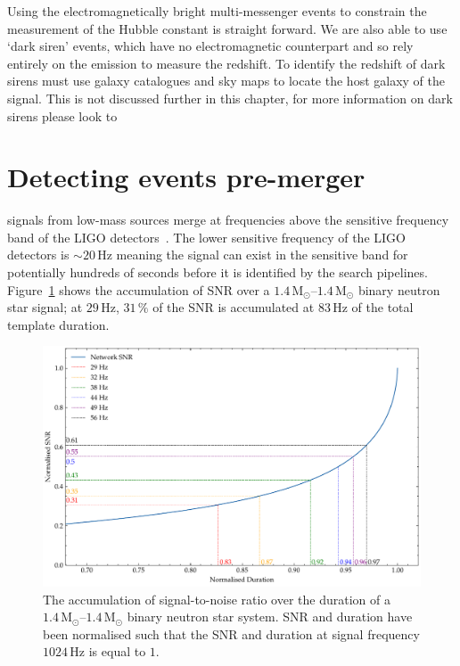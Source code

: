 Using the electromagnetically bright multi-messenger events to constrain the measurement of the Hubble constant is straight forward. We are also able to use `dark siren' events, which have no electromagnetic counterpart and so rely entirely on the \gwadj emission to measure the redshift. To identify the redshift of dark sirens must use galaxy catalogues and \gwadj sky maps to locate the host galaxy of the \gwadj signal. This is not discussed further in this chapter, for more information on dark sirens please look to~\cite{DES:2019, Dalang_dark_sirens:2023}

\section{\label{6:sec:early-warning-search}Detecting \gwadj events pre-merger}

\Gwadj signals from low-mass sources merge at frequencies above the sensitive frequency band of the LIGO \gwadj detectors~\cite{aLIGO_design_curve:2018}. The lower sensitive frequency of the LIGO detectors is ${\sim}20 \, \text{Hz}$ meaning the \gwadj signal can exist in the sensitive band for potentially hundreds of seconds before it is identified by the \gwadj search pipelines. Figure~\ref{6:fig:snr_accumulation} shows the accumulation of SNR over a $1.4 \, \text{M}_{\odot}{\text{--}}1.4 \, \text{M}_{\odot}$ binary neutron star signal; at $29 \, \text{Hz}$, 
$31 \, \text{\%}$ of the SNR is accumulated at $83 \, \text{Hz}$ of the total template duration.
%
\begin{figure}
    \centering
    \includegraphics[width=1.0\linewidth]{images/6_earlywarning/snr_accumulation.pdf}
    \caption{The accumulation of signal-to-noise ratio over the duration of a $1.4 \, \text{M}_{\odot}{\text{--}}1.4 \, \text{M}_{\odot}$ binary neutron star system. SNR and duration have been normalised such that the SNR and duration at signal frequency $1024 \, \text{Hz}$ is equal to $1$.}
    \label{6:fig:snr_accumulation}
\end{figure}
%

